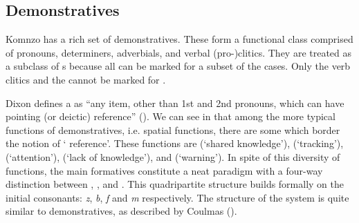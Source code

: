 \subsection{Demonstratives} \label{demonstratives-sec}

Komnzo has a rich set of demonstratives. These form a functional class comprised of pronouns, determiners, adverbials, and verbal (pro-)clitics. They are treated as a subclass of s because all can be marked for a subset of the cases. Only the verb clitics and the   cannot be marked for .

Dixon defines a  as ``any item, other than 1st and 2nd pronouns, which can have pointing (or deictic) reference'' (\citeyear[61-62]{Dixon:2003dj}). We can see in  that among the more typical functions of demonstratives, i.e. spatial functions, there are some which border the notion of ` reference'. These functions are  (`shared knowledge'),  (`tracking'),  (`attention'),  (`lack of knowledge'), and  (`warning'). In spite of this diversity of functions, the main formatives constitute a neat paradigm with a four-way distinction between , ,  and . This quadripartite structure builds formally on the initial consonants: \emph{z}, \emph{b}, \emph{f} and \emph{m} respectively. The structure of the system is quite similar to  demonstratives, as described by Coulmas (\citeyear{Coulmas:1982wl}).

